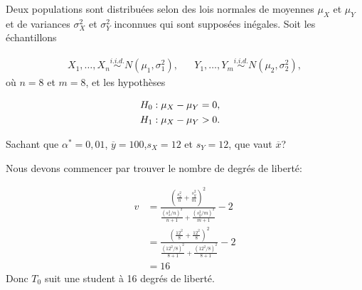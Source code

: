 \begin{questions}
\newpage




\question[9]
Deux populations sont distribuées selon des lois normales de moyennes $\mu_X$ et $\mu_Y$ et de variances $\sigma^2_X$ et $\sigma^2_Y$ inconnues qui sont supposées inégales. Soit les échantillons

\begin{align*}
X_{1}, \ldots, X_{n} \overset{i.i.d.}{\sim} N(\mu_1, \sigma^2_1), & & Y_{1}, \ldots, Y_{m} \overset{i.i.d.}{\sim} N(\mu_2, \sigma^2_2),
\end{align*}
où $n=8$ et $m=8$, et les hypothèses

\begin{align*}
	H_0 &: \mu_X - \mu_Y = 0, \cr
	H_1 &: \mu_X - \mu_Y > 0.
\end{align*}

Sachant que $\alpha^*=0,01$, $\overline{y}=100 $,$s_X=12$ et $s_Y=12$, que vaut $\overline{x}$?


\begin{solution}
Nous devons commencer par trouver le nombre de degrés de liberté:


\begin{align*}
v&=\frac{\left(\frac{s_x^2}{n}+\frac{s_y^2}{m}\right)^2}{\frac{(s_x^2/n)^2}{n+1}+\frac{(s_y^2/m)^2}{m+1}}-2    \\
&= \frac{\left(\frac{12^2}{8}+\frac{12^2}{8}\right)^2}{\frac{(12^2/8)^2}{8+1}+\frac{(12^2/8)^2}{8+1}}-2\\
&=16
\end{align*}
Donc $T_0$ suit une student à 16 degrés de liberté. 


\end{solution}
\end{questions}
